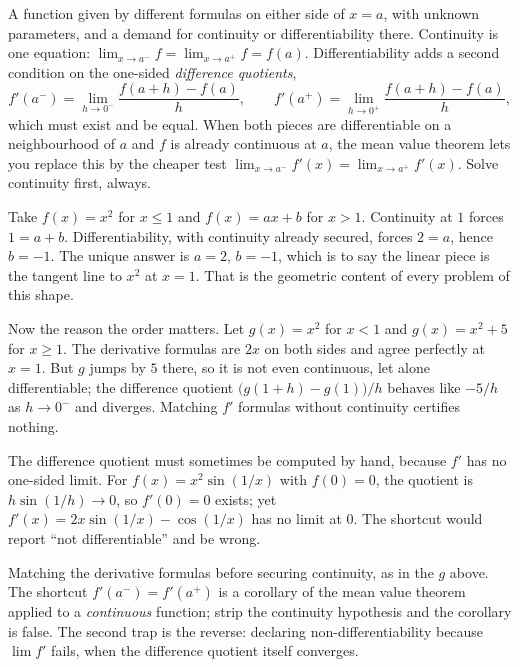 \cue A function given by different formulas on either side of $x=a$, with unknown parameters, and a demand for continuity or differentiability there.
\method Continuity is one equation: $\lim_{x\to a^{-}}f=\lim_{x\to a^{+}}f=f(a)$. Differentiability adds a second condition on the one-sided \emph{difference quotients},
\[f'(a^{-})=\lim_{h\to0^{-}}\frac{f(a+h)-f(a)}{h},\qquad f'(a^{+})=\lim_{h\to0^{+}}\frac{f(a+h)-f(a)}{h},\]
which must exist and be equal. When both pieces are differentiable on a neighbourhood of $a$ and $f$ is already continuous at $a$, the mean value theorem lets you replace this by the cheaper test $\lim_{x\to a^{-}}f'(x)=\lim_{x\to a^{+}}f'(x)$. Solve continuity first, always.

\begin{worked}
Take $f(x)=x^{2}$ for $x\leq1$ and $f(x)=ax+b$ for $x>1$. Continuity at $1$ forces $1=a+b$. Differentiability, with continuity already secured, forces $2=a$, hence $b=-1$. The unique answer is $a=2$, $b=-1$, which is to say the linear piece is the tangent line to $x^{2}$ at $x=1$. That is the geometric content of every problem of this shape.

Now the reason the order matters. Let $g(x)=x^{2}$ for $x<1$ and $g(x)=x^{2}+5$ for $x\geq1$. The derivative formulas are $2x$ on both sides and agree perfectly at $x=1$. But $g$ jumps by $5$ there, so it is not even continuous, let alone differentiable; the difference quotient $\bigl(g(1+h)-g(1)\bigr)/h$ behaves like $-5/h$ as $h\to0^{-}$ and diverges. Matching $f'$ formulas without continuity certifies nothing.

The difference quotient must sometimes be computed by hand, because $f'$ has no one-sided limit. For $f(x)=x^{2}\sin(1/x)$ with $f(0)=0$, the quotient is $h\sin(1/h)\to0$, so $f'(0)=0$ exists; yet $f'(x)=2x\sin(1/x)-\cos(1/x)$ has no limit at $0$. The shortcut would report ``not differentiable'' and be wrong.
\end{worked}

\begin{trap}
Matching the derivative formulas before securing continuity, as in the $g$ above. The shortcut $f'(a^{-})=f'(a^{+})$ is a corollary of the mean value theorem applied to a \emph{continuous} function; strip the continuity hypothesis and the corollary is false. The second trap is the reverse: declaring non-differentiability because $\lim f'$ fails, when the difference quotient itself converges.
\end{trap}

